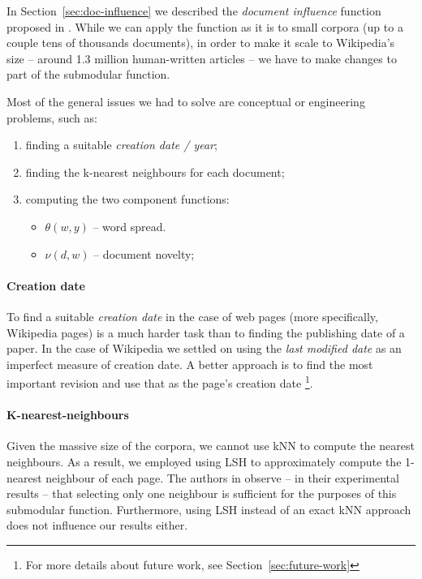 In Section~\vref{sec:doc-influence} we described the \emph{document influence}
function proposed in \cite{sipos2012temporal}.
While we can apply the function as it is to small corpora (up to a couple tens
of thousands documents), in order to make it scale to Wikipedia's size --
around 1.3 million human-written articles -- we have to make changes to part of
the submodular function.

Most of the general issues we had to solve are conceptual or engineering
problems, such as:
\begin{enumerate}
  \item finding a suitable \emph{creation date / year};
  \item finding the k-nearest neighbours for each document;
  \item computing the two component functions:
  \begin{itemize}
    \item \(\theta(w, y)\) -- word spread.
    \item \(\nu(d, w)\) -- document novelty;
  \end{itemize}
\end{enumerate}

\paragraph{Creation date}
To find a suitable \emph{creation date} in the case of web pages (more
specifically, Wikipedia pages) is a much harder task than to finding the
publishing date of a paper.
In the case of Wikipedia we settled on using the \emph{last modified date} as
an imperfect measure of creation date. A better approach is to find the most
important revision and use that as the page's creation date \footnote{For more
details about future work, see Section~\vref{sec:future-work}}.

\paragraph{K-nearest-neighbours}
Given the massive size of the corpora, we cannot use \ac{kNN} to compute the
nearest neighbours. As a result, we employed using \ac{LSH} to approximately
compute the 1-nearest neighbour of each page. The authors in
\cite{sipos2012temporal} observe -- in their experimental results -- that
selecting only one neighbour is sufficient for the purposes of this submodular
function. Furthermore, using \ac{LSH} instead of an exact \ac{kNN} approach
does not influence our results either.

